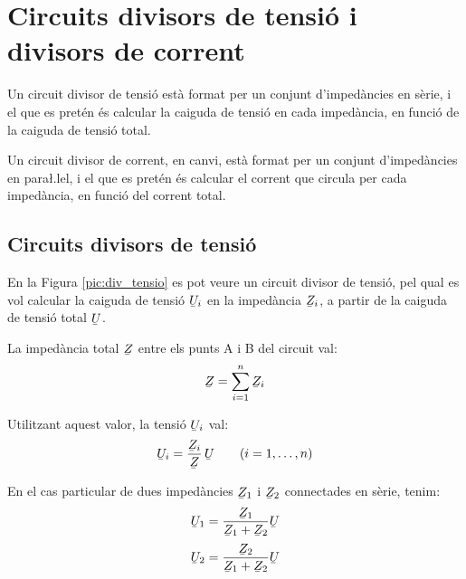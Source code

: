 \section{Circuits divisors de tensi\'{o} i divisors de corrent}\label{sec:div_tens_corr}

Un circuit divisor de tensi\'{o} est\`{a} format per un conjunt
d'imped\`{a}ncies en s\`{e}rie, i el que es pret\'{e}n \'{e}s calcular la caiguda de
tensi\'{o} en cada imped\`{a}ncia, en funci\'{o} de la caiguda de tensi\'{o} total.

Un circuit divisor de corrent, en canvi, est\`{a} format per un conjunt
d'imped\`{a}ncies en para{\l.l}el, i el que es pret\'{e}n \'{e}s calcular el
corrent que circula per cada imped\`{a}ncia, en funci\'{o} del corrent
total.

\subsection{Circuits divisors de tensi\'{o}}\label{sec:circ-div-tens}

En la Figura \vref{pic:div_tensio} es pot veure un circuit divisor
de tensi\'{o}, pel qual es vol calcular la caiguda de tensi\'{o}
$\cmplx{U}_i$ en la imped\`{a}ncia $\cmplx{Z}_i$, a partir de la caiguda
de tensi\'{o} total $\cmplx{U}$.

\begin{center}
\centering
    
    \label{pic:div_tensio}
\end{center}

La imped\`{a}ncia total $\cmplx{Z}$ entre els punts A i B del circuit val:
\begin{equation}
    \cmplx{Z} = \sum_{i=1}^n \cmplx{Z}_i
\end{equation}

Utilitzant aquest valor, la tensi\'{o} $\cmplx{U}_i$ val:
\begin{equation}
    \cmplx{U}_i = \frac{\cmplx{Z}_i}{\cmplx{Z}}\,\cmplx{U}\qquad (i=1,\dots,n)\label{eq:div_tensio}
\end{equation}

En el cas particular de dues imped\`{a}ncies $\cmplx{Z}_1$ i $\cmplx{Z}_2$ connectades en s\`{e}rie, tenim:
\begin{subequations}
\begin{align}
    \cmplx{U}_1 &= \frac{\cmplx{Z}_1}{\cmplx{Z}_1+\cmplx{Z}_2} \cmplx{U}  \\[0.5ex]
    \cmplx{U}_2 &= \frac{\cmplx{Z}_2}{\cmplx{Z}_1+\cmplx{Z}_2} \cmplx{U}
\end{align}
\end{subequations}

